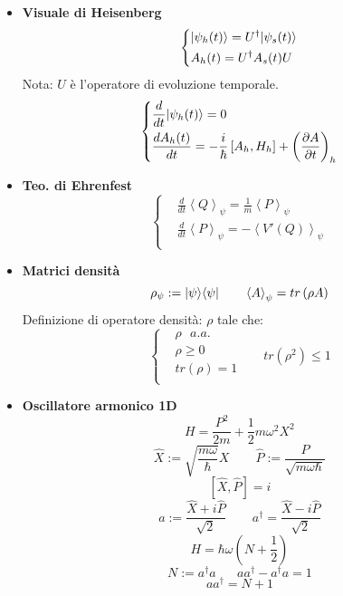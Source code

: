 \documentclass{article}
\DeclarePairedDelimiter\bra{\langle}{\rvert}
\DeclarePairedDelimiter\ket{\lvert}{\rangle}
\begin{document}
\begin{small}
\begin{multicols*}{3}
\begin{itemize}[leftmargin=*]
\begin{itemize}
				
		\end{itemize}
	\item \textbf{Visuale di Heisenberg}
		\[
			\left\{\begin{aligned}
				&\ket*{\psi _h(t)} = U^\dag \ket*{\psi _s(t)} \\
				&A_h(t) = U^\dag A_s(t) U\\
			\end{aligned}\right.
		\]
		Nota: $U$ è l'operatore di evoluzione temporale.
		\[
			\left\{\begin{aligned}
				&\frac{d}{dt}\ket*{\psi _h(t)} = 0 \\
				&\frac{dA_h(t)}{dt} = -\frac{i}{\hbar }\left[A_h, H_h\right] + \left(\frac{\partial A}{\partial t}\right)_h\\
			\end{aligned}\right.
		\]
	\item \textbf{Teo. di Ehrenfest}
		\[
			\left\{\begin{aligned}
				&\frac{d}{dt}\left< Q\right>_\psi = \frac{1}{m} \left< P\right>_\psi \\
				&\frac{d}{dt}\left< P\right>_\psi = -\left< V'(Q)\right>_\psi \\ 
			\end{aligned}\right.
		\]
	\item \textbf{Matrici densità}
		\[\rho _\psi := \ket*{\psi }\bra*{\psi }%
		\hspace{20pt} \left< A\right>_\psi = tr\left(\rho A\right)\]
		Definizione di operatore densità: $\rho $ tale che:
		\[
			\left\{\begin{aligned}
				&\rho \ \ \  a.a.\\
				&\rho \geq 0\\
				&tr (\rho) =1\\
			\end{aligned}\right.
		\hspace{20pt} tr(\rho ^2)\leq 1\]
	\item \textbf{Oscillatore armonico 1D}
		\[H=\frac{P^2}{2m} + \frac{1}{2}m\omega ^2X^2\]
		\[\widehat{X}:=\sqrt{\frac{m\omega }{\hbar }}X \hspace{25pt} \widehat{P}:=\frac{P}{\sqrt{m\omega \hbar }}\]
		\[\left[\widehat{X}, \widehat{P}\right] = i\]
		\[a := \frac{\widehat{X}+i\widehat{P}}{\sqrt{2}} \hspace{25pt} a^\dag = \frac{\widehat{X}-i\widehat{P}}{\sqrt{2}}\]
		\[H = \hbar \omega \left(N+\frac{1}{2}\right)\]
		\[N:=a^\dag a\hspace{20pt} aa^\dag - a^\dag a = 1 \]\[ aa^\dag=N+1\]

\end{itemize}
\end{multicols*}
\end{small}
\end{document}
